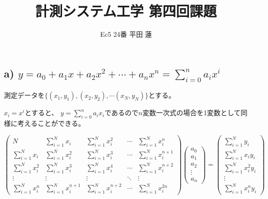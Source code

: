 \documentclass{jsarticle}
\title{計測システム工学 第四回課題}
\author{Ec5 24番 平田 蓮}
\date{}
\begin{document}
\maketitle
\subsection*{a) $\displaystyle y = a_0 + a_1x + a_2x^2 + \cdots + a_nx^n = \sum_{i = 0}^n a_ix^i$}
    測定データを$\{(x_1, y_1), (x_2, y_2), \cdots (x_N, y_N)\}$とする。

    $\displaystyle x_i = x^i$とすると、
    $\displaystyle y = \sum_{i = 0}^n a_ix_i$であるので$n$変数一次式の場合を1変数として同様に考えることができる。

    \begin{equation*}
        \left(
            \begin{array}{ccccc}
                N & \displaystyle\sum_{i=1}^N x_i & \displaystyle\sum_{i=1}^N x_i^2 & \cdots & \displaystyle\sum_{i=1}^N x_i^n \\
                \displaystyle\sum_{i=1}^N x_i & \displaystyle\sum_{i=1}^N x_i^2 & \displaystyle\sum_{i=1}^N x_i^3 & \cdots & \displaystyle\sum_{i=1}^N x_i^{n+1} \\
                \displaystyle\sum_{i=1}^N x_i^2 & \displaystyle\sum_{i=1}^N x_i^3 & \displaystyle\sum_{i=1}^N x_i^4 & \cdots & \displaystyle\sum_{i=1}^N x_i^{n + 2} \\
                \vdots & \vdots & \vdots & \ddots & \vdots \\
                \displaystyle\sum_{i=1}^N x_i^n & \displaystyle\sum_{i=1}^N x_i^{n + 1} & \displaystyle\sum_{i=1}^N x_i^{n + 2} & \cdots & \displaystyle\sum_{i=1}^N x_i^{2n}
            \end{array}
        \right)\left(
            \begin{array}{c}
                a_0 \\
                a_1 \\
                a_2 \\
                \vdots \\
                a_n
            \end{array}
        \right) = \left(
            \begin{array}{c}
                \displaystyle\sum^N_{i=1}y_i \\
                \displaystyle\sum^N_{i=1}x_iy_i \\
                \displaystyle\sum^N_{i=1}x_i^2y_i \\
                \vdots \\
                \displaystyle\sum^N_{i=1}x_i^ny_i
            \end{array}
        \right)
    \end{equation*}
\end{document}
